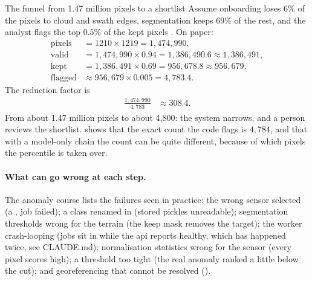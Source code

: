 \begin{worked}[label={we:inference:funnel}]{The funnel from 1.47 million pixels to a shortlist}
Assume onboarding loses $6\%$ of the pixels to cloud and swath edges, segmentation keeps $69\%$ of the
rest, and the analyst flags the top $0.5\%$ of the kept pixels \tagA. On paper:
\begin{align*}
\text{pixels} &= 1210\times1219 = 1{,}474{,}990,\\
\text{valid} &= 1{,}474{,}990\times0.94 = 1{,}386{,}490.6 \approx 1{,}386{,}491,\\
\text{kept} &= 1{,}386{,}491\times0.69 = 956{,}678.8 \approx 956{,}679,\\
\text{flagged} &\approx 956{,}679\times0.005 = 4{,}783.4.
\end{align*}
The reduction factor is
\begin{align*}
\frac{1{,}474{,}990}{4{,}783} &\approx 308.4.
\end{align*}
From about 1.47 million pixels to about 4,800: the system narrows, and a person reviews the shortlist.
 shows that the exact count the code flags is $4{,}784$, and that with a model-only chain
the count can be quite different, because of which pixels the percentile is taken over.
\end{worked}

\paragraph{What can go wrong at each step.} The anomaly course lists the failures seen in practice:
the wrong sensor selected (a , job failed); a class renamed in 
(stored pickles unreadable); segmentation thresholds wrong for the terrain (the keep mask removes the
target); the worker crash-looping (jobs sit in  while the api reports healthy, which has
happened twice, see CLAUDE.md); normalisation statistics wrong for the sensor (every pixel scores high); a
threshold too tight (the real anomaly ranked a little below the cut); and georeferencing that cannot be
resolved ().

